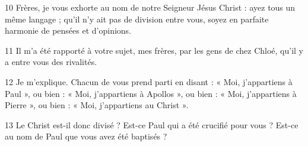 
10 Frères, je vous exhorte au nom de notre Seigneur Jésus Christ : ayez tous un même langage ; qu’il n’y ait pas de division entre vous, soyez en parfaite harmonie de pensées et d’opinions.

11 Il m’a été rapporté à votre sujet, mes frères, par les gens de chez Chloé, qu’il y a entre vous des rivalités.

12 Je m’explique. Chacun de vous prend parti en disant : « Moi, j’appartiens à Paul », ou bien : « Moi, j’appartiens à Apollos », ou bien : « Moi, j’appartiens à Pierre », ou bien : « Moi, j’appartiens au Christ ».

13 Le Christ est-il donc divisé ? Est-ce Paul qui a été crucifié pour vous ? Est-ce au nom de Paul que vous avez été baptisés ?